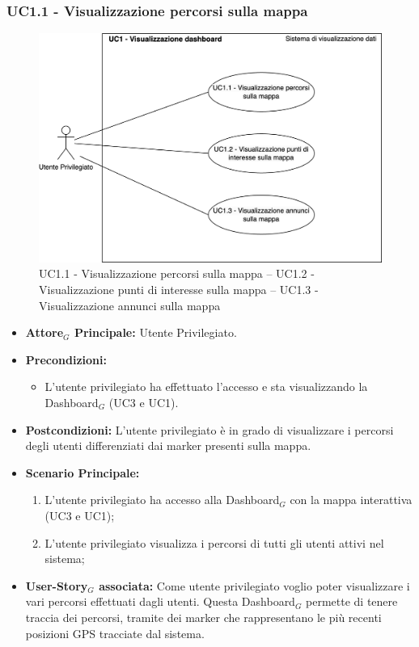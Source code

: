 \documentclass[11pt]{article}
\begin{document}
\begin{justify}

\subsubsection{\textbf{UC1.1 - Visualizzazione percorsi sulla mappa}}
\begin{figure}[H]
    \centering
    \includegraphics[width=0.7\linewidth]{UC1.123image.png}
    \caption{ UC1.1 - Visualizzazione percorsi sulla mappa -- UC1.2 - Visualizzazione punti di interesse sulla mappa -- UC1.3 - Visualizzazione annunci sulla mappa}
    \label{fig:UC1.1}
\end{figure}
\label{UC1.1}
\begin{itemize}
     \item \textbf{Attore$_G$ Principale:} Utente Privilegiato.
     \item \textbf{Precondizioni:}
        \begin{itemize}
    		\item L'utente privilegiato ha effettuato l'accesso e sta      visualizzando la Dashboard$_G$ (UC3 e UC1).
        \end{itemize}
     \item \textbf{Postcondizioni:} L'utente privilegiato è in grado di visualizzare i percorsi degli utenti differenziati dai marker presenti sulla mappa.
     \item \textbf{Scenario Principale:}
        \begin{enumerate}
            \item L'utente privilegiato ha accesso alla Dashboard$_G$ con la mappa interattiva (UC3 e UC1);
            \item L'utente privilegiato visualizza i percorsi di tutti gli utenti attivi nel sistema;
        \end{enumerate}
     \item \textbf{User-Story$_G$ associata:}
     Come utente privilegiato voglio poter visualizzare i vari percorsi effettuati dagli utenti. Questa Dashboard$_G$ permette di tenere traccia dei percorsi, tramite dei marker che rappresentano le più recenti posizioni GPS tracciate dal sistema.
\end{itemize}

\end{justify}
\end{document}
